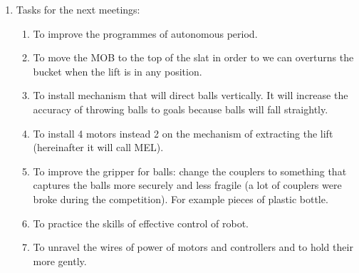 \begin{enumerate}
\begin{enumerate}
  \end{enumerate}
  
  \item Tasks for the next meetings:
  \begin{enumerate}
  	\item To improve the programmes of autonomous period.
  	
  	\item To move the MOB to the top of the slat in order to we can overturns the bucket when the lift is in any position.
  	
  	\item To install mechanism that will direct balls vertically. It will increase the accuracy of throwing balls to goals because balls will fall straightly.
  	
  	\item To install 4 motors instead 2 on the mechanism of extracting the lift (hereinafter it will call MEL).
  	
  	\item To improve the gripper for balls: change the couplers to something that captures the balls more securely and less fragile (a lot of couplers were broke during the competition). For example pieces of plastic bottle.
  	
  	\item To practice the skills of effective control of robot.
  	
  	\item To unravel the wires of power of motors and controllers and to hold their more gently.
  	
  \end{enumerate}
  
\end{enumerate}
\fillpage